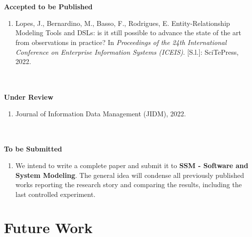 \\~\\
\textbf{Accepted to be Published} 

    \begin{enumerate}[label=\roman*.]
        \item Lopes, J., Bernardino, M., Basso, F., Rodrigues, E. Entity-Relationship Modeling Tools and DSLs: is it still possible to advance the state of the art from observations in practice? In \textit{Proceedings of the 24th International Conference on Enterprise Information Systems (ICEIS)}. [S.l.]: SciTePress, 2022.
    \end{enumerate} 

\\~\\
\textbf{Under Review}  

\begin{enumerate}[label=\roman*.]
    \item Journal of Information Data Management (JIDM), 2022.
\end{enumerate} 

\linebreak
\\~\\
\textbf{To be Submitted} 
    \begin{enumerate}[label=\roman*.]
        \item We intend to write a complete paper and submit it to \textbf{SSM - Software and System Modeling}.
        The general idea will condense all previously published works reporting the research story and comparing the results, including the last controlled experiment.
    \end{enumerate} 

\section{Future Work}

